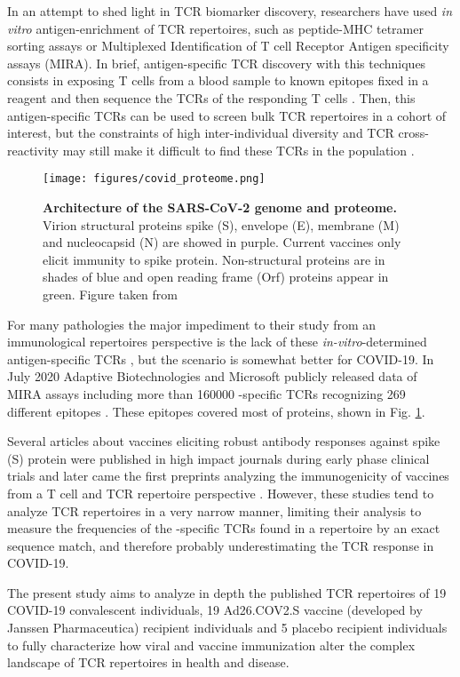 
In an attempt to shed light in TCR biomarker discovery, researchers have used \textit{in vitro} antigen-enrichment of TCR repertoires, such as peptide-MHC tetramer sorting assays or Multiplexed Identification of T cell Receptor Antigen specificity assays (MIRA). In brief, antigen-specific TCR discovery with this techniques consists in exposing T cells from a blood sample to known epitopes fixed in a reagent and then sequence the TCRs of the responding T cells \citep{miratech}. Then, this antigen-specific TCRs can be used to screen bulk TCR repertoires in a cohort of interest, but the constraints of high inter-individual diversity and TCR cross-reactivity may still make it difficult to find these TCRs in the population \citep{metaclonotypes}.

\begin{figure}[!t]
	\centering
	\texttt{[image: figures/covid\_proteome.png]}
	\caption{\textbf{Architecture of the SARS-CoV-2 genome and proteome.} Virion structural proteins spike (S), envelope (E), membrane (M) and nucleocapsid (N) are showed in purple. Current vaccines only elicit immunity to spike protein. Non-structural proteins are in shades of blue and open reading frame (Orf) proteins appear in green. Figure taken from \cite{covid3d}}
	\label{fig:covidprot}
\end{figure}

For many pathologies the major impediment to their study from an immunological repertoires perspective is the lack of these \textit{in-vitro}-determined antigen-specific TCRs \citep{tcrml}, but the scenario is somewhat better for COVID-19. In July 2020 Adaptive Biotechnologies and Microsoft publicly released data of MIRA assays including more than 160000 \covid-specific TCRs recognizing 269 different \covid{} epitopes \citep{immunecode}. These epitopes covered most of \covid{} proteins, shown in Fig. \ref{fig:covidprot}.

Several articles about \covid{} vaccines eliciting robust antibody responses against \covid{} spike (S) protein were published in high impact journals during early phase clinical trials \citep{pfizerab, janssenab, astrazenecaab} and later came the first preprints analyzing the immunogenicity of vaccines from a T cell and TCR repertoire perspective \citep{pfizertcr, janssen, astrazenecatcr}. However, these studies tend to analyze TCR repertoires in a very narrow manner, limiting their analysis to measure the frequencies of the \covid-specific TCRs found in a repertoire by an exact sequence match, and therefore probably underestimating the TCR response in COVID-19.

The present study aims to analyze in depth the published TCR repertoires of 19 COVID-19 convalescent individuals, 19 Ad26.COV2.S vaccine (developed by Janssen Pharmaceutica) recipient individuals and 5 placebo recipient individuals to fully characterize how viral and vaccine immunization alter the complex landscape of TCR repertoires in health and disease.



